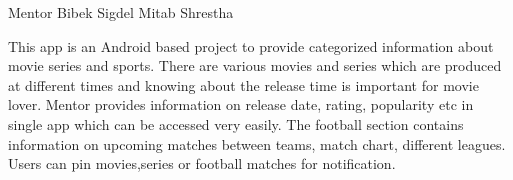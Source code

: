  \begin{conf-abstract}[]
 {Mentor}
 {
  	 Bibek Sigdel
  	 Mitab Shrestha 
 }
{}

This app is an Android based project to provide categorized information about movie series and sports. There are various movies and series which are produced at different times and knowing about the release time is important for movie lover. Mentor provides information on release date, rating, popularity etc in single app which can be accessed very easily. The football section contains information on upcoming matches between teams, match chart, different leagues. Users can pin movies,series or football matches for notification.
 \end{conf-abstract}
